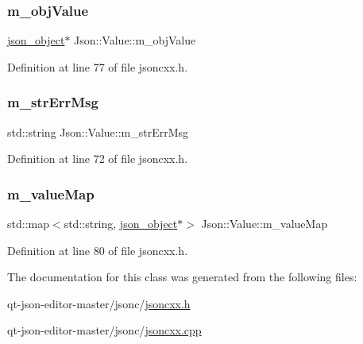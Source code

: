 \mbox{\label{class_json_1_1_value_a3a705e06c2dbc4a6e142b58b0cbca57e}} 
\subsubsection{\texorpdfstring{m\+\_\+obj\+Value}{m\_objValue}}
{\footnotesize\ttfamily \hyperlink{structjson__object}{json\+\_\+object}$\ast$ Json\+::\+Value\+::m\+\_\+obj\+Value\hspace{0.3cm}{\ttfamily [protected]}}



Definition at line 77 of file jsoncxx.\+h.

\mbox{\label{class_json_1_1_value_aced2ebc80b7cdb15b35e858df1f0b886}} 
\subsubsection{\texorpdfstring{m\+\_\+str\+Err\+Msg}{m\_strErrMsg}}
{\footnotesize\ttfamily std\+::string Json\+::\+Value\+::m\+\_\+str\+Err\+Msg}



Definition at line 72 of file jsoncxx.\+h.

\mbox{\label{class_json_1_1_value_a2b9203575d8ff75f02d30e09befb1204}} 
\subsubsection{\texorpdfstring{m\+\_\+value\+Map}{m\_valueMap}}
{\footnotesize\ttfamily std\+::map$<$std\+::string, \hyperlink{structjson__object}{json\+\_\+object}$\ast$$>$ Json\+::\+Value\+::m\+\_\+value\+Map\hspace{0.3cm}{\ttfamily [protected]}}



Definition at line 80 of file jsoncxx.\+h.



The documentation for this class was generated from the following files\+:\begin{DoxyCompactItemize}
\item 
qt-\/json-\/editor-\/master/jsonc/\hyperlink{jsoncxx_8h}{jsoncxx.\+h}\item 
qt-\/json-\/editor-\/master/jsonc/\hyperlink{jsoncxx_8cpp}{jsoncxx.\+cpp}\end{DoxyCompactItemize}
